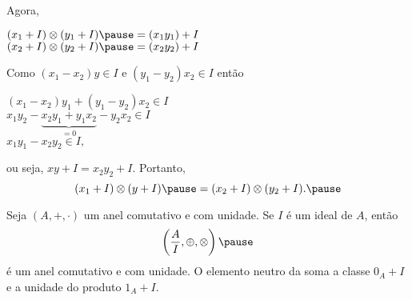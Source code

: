 \documentclass{beamer}
\begin{document}
    \begin{frame}
        Agora,\pause 
        \begin{center}
            $(x_1 + I) \otimes (y_1 + I) \pause = (x_1y_1) + I$\pause\\
            $(x_2 + I) \otimes (y_2 + I) \pause = (x_2y_2) + I$\pause
        \end{center}

        Como $(x_1 - x_2)y \in I$ \pause e $(y_1 - y_2)x_2 \in I$ \pause ent\~ao\pause
        \begin{center}
            $(x_1 - x_2)y_1 + (y_1 - y_2)x_2 \in I$\pause\\
            $x_1y_2-\underbrace{x_2y_1 + y_1x_2}_{= 0} - y_2x_2 \in I$\pause\\
            $x_1y_1 - x_2y_2\in I,$\pause 
        \end{center}
        ou seja, \pause $xy + I = x_2y_2 + I$. \pause Portanto,\pause 
        \[
            (x_1 + I) \otimes (y + I) \pause = (x_2 + I) \otimes (y_2 + I).\pause
        \]
    \end{frame}

    \begin{frame}
        \begin{teorema}
            Seja $(A, +, \cdot)$ um anel comutativo \pause e com unidade. \pause Se $I$ {\'e} um ideal de $A$, \pause então
            \[
                \left(\dfrac{A}{I}, \oplus, \otimes\right)\pause 
            \]
            {\'e} um anel comutativo \pause e com unidade. \pause O elemento neutro da soma  a classe $0_{A} + I$ \pause e a unidade do produto  $1_{A} + I$.\pause
        \end{teorema}
    \end{frame}
\end{document}
